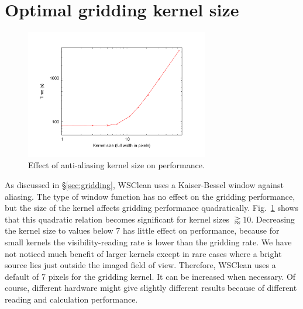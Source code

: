 \documentclass[useAMS,usenatbib]{mn2e}
\DeclareRobustCommand{\TUSSEN}[3]{#2}
\begin{document}
\section{Optimal gridding kernel size} \label{sec:gridding-appendix}
\begin{figure}
\begin{center}
\includegraphics[width=8cm]{img/benchmark-kernelsize/kernel}
\caption{Effect of anti-aliasing kernel size on performance.}
\label{fig:timing-kernelsize}
\end{center}
\end{figure}
As discussed in \S\ref{sec:gridding}, WSClean uses a Kaiser-Bessel window against aliasing. The type of window function has no effect on the gridding performance, but the size of the kernel affects gridding performance quadratically. Fig.~\ref{fig:timing-kernelsize} shows that this quadratic relation becomes significant for kernel sizes $\gtrapprox 10$. Decreasing the kernel size to values below $7$ has little effect on performance, because for small kernels the visibility-reading rate is lower than the gridding rate. We have not noticed much benefit of larger kernels except in rare cases where a bright source lies just outside the imaged field of view. Therefore, WSClean uses a default of 7 pixels for the gridding kernel. It can be increased when necessary. Of course, different hardware might give slightly different results because of different reading and calculation performance.

\DeclareRobustCommand{\TUSSEN}[3]{#3}




\label{lastpage}
\end{document}
